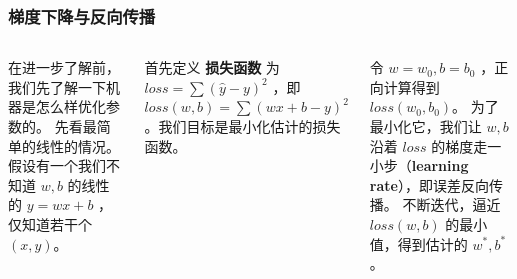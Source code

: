 \begin{frame}
    \frametitle{梯度下降与反向传播}
    \begin{columns}
        在进一步了解前，我们先了解一下机器是怎么样优化参数的。
        先看最简单的线性的情况。
        假设有一个我们不知道 $w,b$ 的线性的 $y=wx+b$ ，仅知道若干个 $(x,y)$。

        首先定义 \textbf{损失函数} 为 $loss = \sum{(\hat{y}-y)^2}$ ，即 $loss(w, b)=\sum(wx+b-y)^2$ 。我们目标是最小化估计的损失函数。

        令 $w=w_0,b=b_0$ ，正向计算得到 $loss(w_0,b_0)$。
        为了最小化它，我们让 $w,b$ 沿着 $loss$ 的梯度走一小步（\textbf{learning rate}），即误差反向传播。
        不断迭代，逼近 $loss(w,b)$ 的最小值，得到估计的 $w^*,b^*$。
    \end{columns}
\end{frame}

